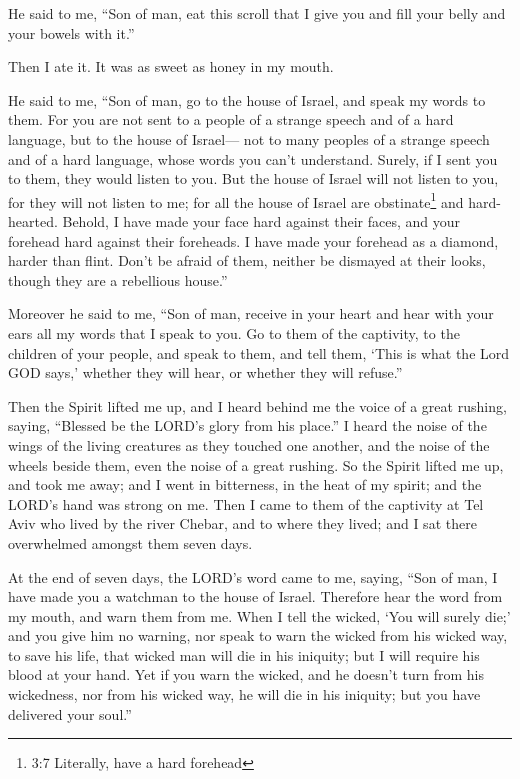  He said to me, ``Son of man, eat this scroll that I give
you and fill your belly and your bowels with it.''

Then I ate it. It was as sweet as honey in my mouth.

 He said to me, ``Son of man, go to the house of Israel, and
speak my words to them.  For you are not sent to a people of
a strange speech and of a hard language, but to the house of Israel---
 not to many peoples of a strange speech and of a hard
language, whose words you can't understand. Surely, if I sent you to
them, they would listen to you.  But the house of Israel
will not listen to you, for they will not listen to me; for all the
house of Israel are obstinate\footnote{3:7 Literally, have a hard
  forehead} and hard-hearted.  Behold, I have made your face
hard against their faces, and your forehead hard against their
foreheads.  I have made your forehead as a diamond, harder
than flint. Don't be afraid of them, neither be dismayed at their looks,
though they are a rebellious house.''

 Moreover he said to me, ``Son of man, receive in your
heart and hear with your ears all my words that I speak to you.
 Go to them of the captivity, to the children of your
people, and speak to them, and tell them, `This is what the Lord GOD
says,' whether they will hear, or whether they will refuse.''

 Then the Spirit lifted me up, and I heard behind me the
voice of a great rushing, saying, ``Blessed be the LORD's glory from his
place.''  I heard the noise of the wings of the living
creatures as they touched one another, and the noise of the wheels
beside them, even the noise of a great rushing.  So the
Spirit lifted me up, and took me away; and I went in bitterness, in the
heat of my spirit; and the LORD's hand was strong on me. 
Then I came to them of the captivity at Tel Aviv who lived by the river
Chebar, and to where they lived; and I sat there overwhelmed amongst
them seven days.

 At the end of seven days, the LORD's word came to me,
saying,  ``Son of man, I have made you a watchman to the
house of Israel. Therefore hear the word from my mouth, and warn them
from me.  When I tell the wicked, `You will surely die;'
and you give him no warning, nor speak to warn the wicked from his
wicked way, to save his life, that wicked man will die in his iniquity;
but I will require his blood at your hand.  Yet if you warn
the wicked, and he doesn't turn from his wickedness, nor from his wicked
way, he will die in his iniquity; but you have delivered your soul.''

